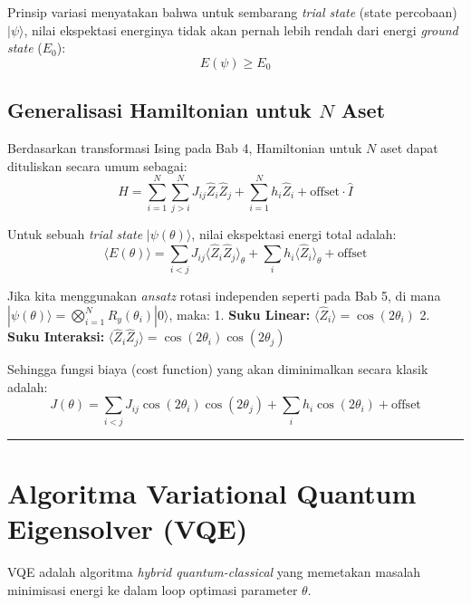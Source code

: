 \documentclass[12pt,a4paper]{article}
\begin{document}
Prinsip variasi menyatakan bahwa untuk sembarang \emph{trial state} (state percobaan) \(|\psi\rangle\), nilai ekspektasi energinya tidak akan pernah lebih rendah dari energi \emph{ground state} (\(E_0\)): \[ E(\psi) \ge E_0 \]

\hypertarget{b.-generalisasi-hamiltonian-untuk-n-aset}{%
\subsection{\texorpdfstring{Generalisasi Hamiltonian untuk \(N\) Aset}{Generalisasi Hamiltonian untuk N Aset}}\label{b.-generalisasi-hamiltonian-untuk-n-aset}}

Berdasarkan transformasi Ising pada Bab 4, Hamiltonian untuk \(N\) aset dapat dituliskan secara umum sebagai: \[ \hat{H} = \sum_{i=1}^N \sum_{j>i}^N J_{ij} \hat{Z}_i \hat{Z}_j + \sum_{i=1}^N h_i \hat{Z}_i + \text{offset} \cdot \hat{I} \]

Untuk sebuah \emph{trial state} \(|\psi(\theta)\rangle\), nilai ekspektasi energi total adalah: \[ \langle E(\theta) \rangle = \sum_{i<j} J_{ij} \langle \hat{Z}_i \hat{Z}_j \rangle_{\theta} + \sum_i h_i \langle \hat{Z}_i \rangle_{\theta} + \text{offset} \]

Jika kita menggunakan \emph{ansatz} rotasi independen seperti pada Bab 5, di mana \(|\psi(\theta)\rangle = \bigotimes_{i=1}^N R_y(\theta_i)|0\rangle\), maka: 1. \textbf{Suku Linear:} \(\langle \hat{Z}_i \rangle = \cos(2\theta_i)\) 2. \textbf{Suku Interaksi:} \(\langle \hat{Z}_i \hat{Z}_j \rangle = \cos(2\theta_i)\cos(2\theta_j)\)

Sehingga fungsi biaya (cost function) yang akan diminimalkan secara klasik adalah: \[ J(\theta) = \sum_{i<j} J_{ij} \cos(2\theta_i)\cos(2\theta_j) + \sum_i h_i \cos(2\theta_i) + \text{offset} \]

\begin{center}\rule{0.5\linewidth}{0.5pt}\end{center}

\hypertarget{algoritma-variational-quantum-eigensolver-vqe}{%
\section{Algoritma Variational Quantum Eigensolver (VQE)}\label{algoritma-variational-quantum-eigensolver-vqe}}

VQE adalah algoritma \emph{hybrid quantum-classical} yang memetakan masalah minimisasi energi ke dalam loop optimasi parameter \(\theta\).
\end{document}
